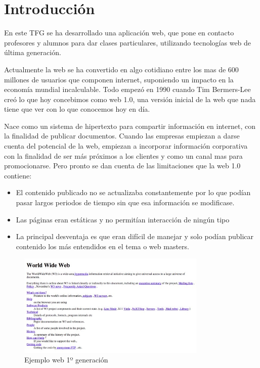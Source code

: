 \chapter{Introducción}
En este TFG se ha desarrollado una aplicación web, que pone en contacto profesores y alumnos para dar clases particulares, utilizando tecnologías web de última generación.

Actualmente la web se ha convertido en algo cotidiano entre los mas de 600 millones de usuarios que componen internet, suponiendo un impacto en la economía mundial incalculable. Todo empezó en 1990 cuando Tim Bermers-Lee creó lo que hoy concebimos como web 1.0, una versión inicial de la web que nada tiene que ver con lo que conocemos hoy en día.

Nace como un sistema de hipertexto para compartir información en internet, con la finalidad de publicar documentos. Cuando las empresas empiezan a darse cuenta del potencial de la web, empiezan a incorporar información corporativa con la finalidad de ser más próximos a los clientes y como un canal mas para promocionarse. Pero pronto se dan cuenta de las limitaciones que la web 1.0 contiene:

\begin{itemize}

    \item El contenido publicado no se actualizaba constantemente por lo que podían pasar largos periodos de tiempo sin que esa información se modificase.

    \item Las páginas eran estáticas y no permitían interacción de ningún tipo

    \item La principal desventaja es que eran difícil de manejar y solo podían publicar contenido los más entendidos en el tema o web masters.

\end{itemize}


\begin{figure}[!h]
    \centering
    \includegraphics[width=90mm]{img/introduccion/web1.jpg}
    \caption[Ejemplo web 1º generación]{Ejemplo web 1º generación}
\end{figure}

